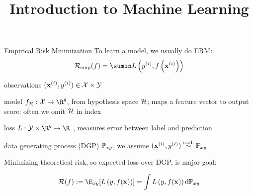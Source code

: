 \documentclass[11pt,compress,t,notes=noshow, xcolor=table]{beamer}
\title{Introduction to Machine Learning}
\begin{document}
    

\begin{frame}{Empirical Risk Minimization}
To learn a model, we usually do ERM:
$$\riskef = \sumin \Lxyi$$

\begin{itemizeM}[small]
    \item observations $(\mathbf{x}^{(i)}, y^{(i)}) \in  \mathcal{X} \times \mathcal{Y}$
    \item model $f_{\Hspace}:\Xspace \rightarrow \R^g$, 
    from hypothesis space $\mathcal{H}$;
    maps a feature vector to output score;
    often we omit $\mathcal{H}$ in index 
    \item loss $L:\Yspace\times\R^g\rightarrow\R$ ,
    measures error between label and prediction
    \item data generating process (DGP) $\mathbb{P}_{xy}$, we assume %
    $(\mathbf{x}^{(i)}, y^{(i)})  \overset{\text{i.i.d.}}{\sim} \mathbb{P}_{xy}$  
\end{itemizeM}

Minimizing theoretical risk, so expected loss over DGP, is major goal:

$$ \risk (f) := \E_{xy} [\Lxy] = \int \Lxy \text{d}\Pxy $$

\end{frame}
\end{document}
